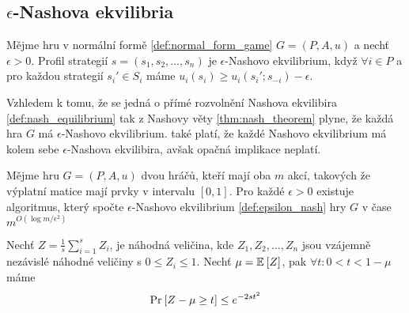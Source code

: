\subsection{$\epsilon$-Nashova ekvilibria}
\begin{definition}
\label{def:epsilon_nash}
Mějme hru v normální formě \ref{def:normal_form_game} $G=(P,A,u)$ a nechť $\epsilon > 0$. 
Profil strategií $s = (s_1,s_2, \dots, s_n)$ je $\epsilon$-Nashovo ekvilibrium, když $\forall i \in P$ a pro každou strategií $s_i' \in S_i$ máme $u_i(s_i) \geq u_i(s_i' ; s_{-i}) - \epsilon$.
\end{definition}
Vzhledem k tomu, že se jedná o přímé rozvolnění Nashova ekvilibira \ref{def:nash_equilibrium} tak z Nashovy věty \ref{thm:nash_theorem} plyne, že každá hra $G$ má $\epsilon$-Nashovo ekvilibrium.
také platí, že každé Nashovo ekvilibrium má kolem sebe $\epsilon$-Nashova ekvilibira, avšak opačná implikace neplatí. 

\begin{theorem}
\label{thm:e_nash_in_time}
Mějme hru $G = (P,A,u)$ dvou hráčů, kteří mají oba $m$ akcí, takových že výplatní matice mají prvky v intervalu $[0,1]$. 
Pro každé $\epsilon >0$ existuje algoritmus, který spočte $\epsilon$-Nashovo ekvilibrium \ref{def:epsilon_nash} hry $G$ v čase $m^{O(\log m / \epsilon^2)}$
\end{theorem}
\begin{theorem}
\label{thm:hoeffding_bound}
Nechť $Z = \frac{1}{s} \sum^s_{i = 1} Z_i$, je náhodná veličina, kde $Z_1, Z_2, \dots, Z_n$ jsou vzájemně nezávislé náhodné veličiny s $0 \leq Z_i \leq 1$.
Nechť $\mu = \mathbb{E}_{}\left[Z\right]$, pak $\forall t: 0<t<1 - \mu$ máme 
\[
    \text{Pr}_{}\left[Z - \mu \geq t\right] \leq e^{-2st^2}
\]
\end{theorem}

